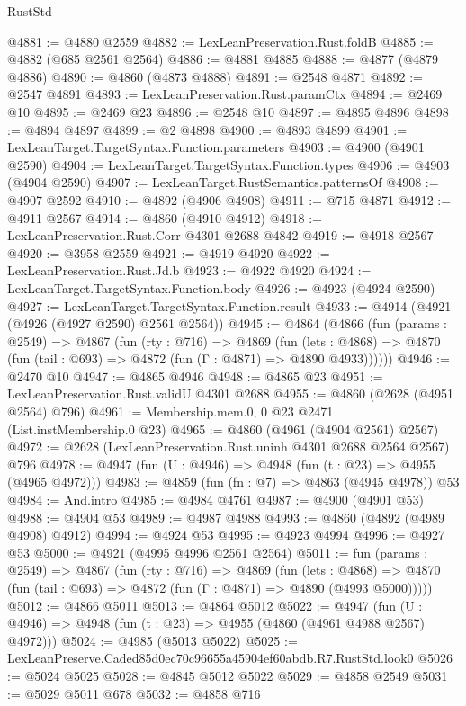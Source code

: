 \begin{lexlean}{RustStd}
\begin{coremodule}
@4881 := @4880 @2559
@4882 := LexLeanPreservation.Rust.foldB
@4885 := @4882 (@685 @2561 @2564)
@4886 := @4881 @4885
@4888 := @4877 (@4879 @4886)
@4890 := @4860 (@4873 @4888)
@4891 := @2548 @4871
@4892 := @2547 @4891
@4893 := LexLeanPreservation.Rust.paramCtx
@4894 := @2469 @10
@4895 := @2469 @23
@4896 := @2548 @10
@4897 := @4895 @4896
@4898 := @4894 @4897
@4899 := @2 @4898
@4900 := @4893 @4899
@4901 := LexLeanTarget.TargetSyntax.Function.parameters
@4903 := @4900 (@4901 @2590)
@4904 := LexLeanTarget.TargetSyntax.Function.types
@4906 := @4903 (@4904 @2590)
@4907 := LexLeanTarget.RustSemantics.patternsOf
@4908 := @4907 @2592
@4910 := @4892 (@4906 @4908)
@4911 := @715 @4871
@4912 := @4911 @2567
@4914 := @4860 (@4910 @4912)
@4918 := LexLeanPreservation.Rust.Corr @4301 @2688 @4842
@4919 := @4918 @2567
@4920 := @3958 @2559
@4921 := @4919 @4920
@4922 := LexLeanPreservation.Rust.Jd.b
@4923 := @4922 @4920
@4924 := LexLeanTarget.TargetSyntax.Function.body
@4926 := @4923 (@4924 @2590)
@4927 := LexLeanTarget.TargetSyntax.Function.result
@4933 := @4914 (@4921 (@4926 (@4927 @2590) @2561 @2564))
@4945 := @4864
    (@4866
      (fun (params : @2549) =>
      @4867
        (fun (rty : @716) =>
        @4869
          (fun (lets : @4868) =>
          @4870 (fun (tail : @693) => @4872 (fun (Γ : @4871) => @4890 @4933))))))
@4946 := @2470 @10
@4947 := @4865 @4946
@4948 := @4865 @23
@4951 := LexLeanPreservation.Rust.validU @4301 @2688
@4955 := @4860 (@2628 (@4951 @2564) @796)
@4961 := Membership.mem.{0, 0} @23 @2471 (List.instMembership.{0} @23)
@4965 := @4860 (@4961 (@4904 @2561) @2567)
@4972 := @2628 (LexLeanPreservation.Rust.uninh @4301 @2688 @2564 @2567) @796
@4978 := @4947 (fun (U : @4946) => @4948 (fun (t : @23) => @4955 (@4965 @4972)))
@4983 := @4859 (fun (fn : @7) => @4863 (@4945 @4978)) @53
@4984 := And.intro
@4985 := @4984 @4761
@4987 := @4900 (@4901 @53)
@4988 := @4904 @53
@4989 := @4987 @4988
@4993 := @4860 (@4892 (@4989 @4908) @4912)
@4994 := @4924 @53
@4995 := @4923 @4994
@4996 := @4927 @53
@5000 := @4921 (@4995 @4996 @2561 @2564)
@5011 := fun (params : @2549) =>
  @4867
    (fun (rty : @716) =>
    @4869
      (fun (lets : @4868) =>
      @4870 (fun (tail : @693) => @4872 (fun (Γ : @4871) => @4890 (@4993 @5000)))))
@5012 := @4866 @5011
@5013 := @4864 @5012
@5022 := @4947 (fun (U : @4946) => @4948 (fun (t : @23) => @4955 (@4860 (@4961 @4988 @2567) @4972)))
@5024 := @4985 (@5013 @5022)
@5025 := LexLeanPreserve.Caded85d0ec70c96655a45904ef60abdb.R7.RustStd.look0
@5026 := @5024 @5025
@5028 := @4845 @5012 @5022
@5029 := @4858 @2549
@5031 := @5029 @5011 @678
@5032 := @4858 @716

\end{coremodule}
\end{lexlean}
